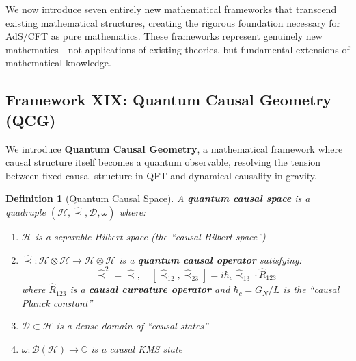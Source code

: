 \documentclass[12pt,a4paper]{article}
\newtheorem{definition}[theorem]{Definition}
\begin{document}
We now introduce seven entirely new mathematical frameworks that transcend existing mathematical structures, creating the rigorous foundation necessary for AdS/CFT as pure mathematics. These frameworks represent genuinely new mathematics---not applications of existing theories, but fundamental extensions of mathematical knowledge.

\subsection{Framework XIX: Quantum Causal Geometry (QCG)}

We introduce \textbf{Quantum Causal Geometry}, a mathematical framework where causal structure itself becomes a quantum observable, resolving the tension between fixed causal structure in QFT and dynamical causality in gravity.

\begin{definition}[Quantum Causal Space]\label{def:quantum-causal-space}
A \textbf{quantum causal space} is a quadruple $(\mathcal{H}, \hat{\prec}, \mathcal{D}, \omega)$ where:
\begin{enumerate}
    \item $\mathcal{H}$ is a separable Hilbert space (the ``causal Hilbert space'')
    \item $\hat{\prec}: \mathcal{H} \otimes \mathcal{H} \to \mathcal{H} \otimes \mathcal{H}$ is a \textbf{quantum causal operator} satisfying:
    \begin{equation}
    \hat{\prec}^2 = \hat{\prec}, \quad [\hat{\prec}_{12}, \hat{\prec}_{23}] = i\hbar_c \hat{\prec}_{13} \cdot \hat{R}_{123}
    \end{equation}
    where $\hat{R}_{123}$ is a \textbf{causal curvature operator} and $\hbar_c = G_N/L$ is the ``causal Planck constant''
    \item $\mathcal{D} \subset \mathcal{H}$ is a dense domain of ``causal states''
    \item $\omega: \mathcal{B}(\mathcal{H}) \to \mathbb{C}$ is a causal KMS state
\end{enumerate}
\end{definition}
\end{document}
